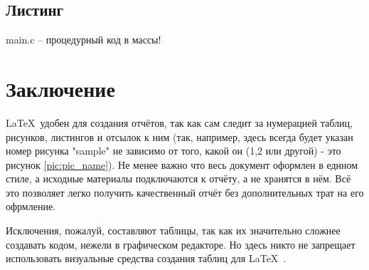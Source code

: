 \subsection{Листинг}
\begin{code}
	
	\caption{main.c – процедурный код в массы!}
\end{code}

\newpage
\section*{Заключение}
\LaTeX\ удобен для создания отчётов, так как сам следит за нумерацией таблиц, рисунков, листингов и отсылок к ним (так, например, здесь всегда будет указан номер рисунка "sample" не зависимо от того, какой он (1,2 или другой) - это рисунок \ref{pic:pic_name}). Не менее важно что весь документ оформлен в едином стиле, а исходные материалы подключаются к отчёту, а не хранятся в нём. Всё это позволяет легко получить качественный отчёт без дополнительных трат на его офрмление.

Исключения, пожалуй, составляют таблицы, так как их значительно сложнее создавать кодом, нежели в графическом редакторе. Но здесь никто не запрещает использовать визуальные средства создания таблиц для \LaTeX\ .
